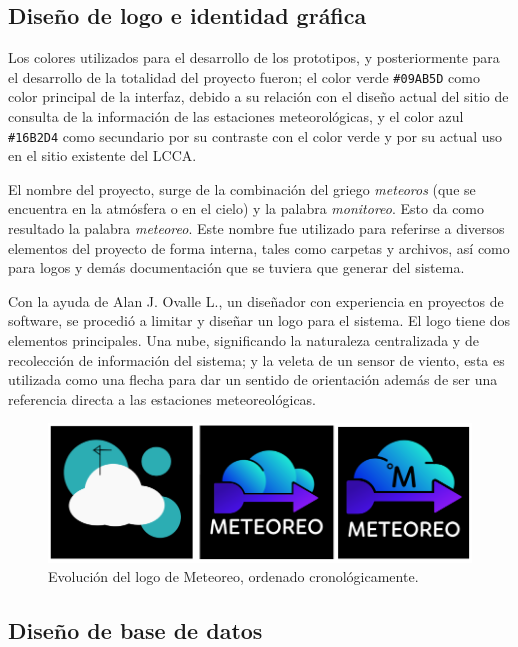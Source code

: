 \pagebreak

\subsection{Diseño de logo e identidad gráfica}

Los colores utilizados para el desarrollo de los prototipos, y posteriormente para el desarrollo de la totalidad del proyecto fueron; el color verde \texttt{\#09AB5D} como color principal de la interfaz, debido a su relación con el diseño actual del sitio de consulta de la información de las estaciones meteorológicas, y el color azul \texttt{\#16B2D4} como secundario por su contraste con el color verde y por su actual uso en el sitio existente del LCCA.

El nombre del proyecto, surge de la combinación del griego \textit{meteoros} (que se encuentra en la atmósfera o en el cielo) y la palabra \textit{monitoreo}. Esto da como resultado la palabra \textit{meteoreo}. Este nombre fue utilizado para referirse a diversos elementos del proyecto de forma interna, tales como carpetas y archivos, así como para logos y demás documentación que se tuviera que generar del sistema.

Con la ayuda de Alan J. Ovalle L., un diseñador con experiencia en proyectos de software, se procedió a limitar y diseñar un logo para el sistema. El logo tiene dos elementos principales. Una nube, significando la naturaleza centralizada y de recolección de información del sistema; y la veleta de un sensor de viento, esta es utilizada como una flecha para dar un sentido de orientación además de ser una referencia directa a las estaciones meteoreológicas.

\begin{figure}[!ht]
	\centering
	\includegraphics[width=1\linewidth]{images/logos/evolution.png}
	\caption{Evolución del logo de Meteoreo, ordenado cronológicamente.}
	\label{fig:logo_evolution}
\end{figure}

\subsection{Diseño de base de datos}


